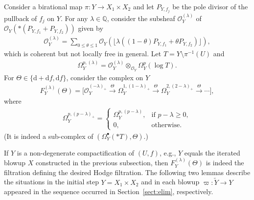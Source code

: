 \documentclass[11pt]{article}
\newcommand{\QQ}{\mathbb{Q}}
\newcommand{\sO}{\mathscr{O}}
\newcommand{\de}{\mathrm{d}}
\newcommand{\ddRH}{\Theta}
\newcommand{\cpt}{compactification}
\newcommand{\flr}[1]{\lfloor #1 \rfloor}
\begin{document}
Consider a birational map $\pi\colon Y \to X_1\times X_2$ and let $P_{Y,f_j}$ be the pole divisor of the pullback of $f_j$ on $Y$. For any $\lambda\in\QQ$, consider the subsheaf $\sO_Y^{(\lambda)}$ of $\sO_Y(*(P_{Y,f_1}+P_{Y,f_2}))$ given by
\begin{gather*} \sO_Y^{(\lambda)} = \sum_{0\leq\theta\leq1} \sO_Y\left(\flr{\lambda((1-\theta) P_{Y,f_1} + \theta P_{Y,f_2})}\right), \end{gather*}
which is coherent but not locally free in general. Let $T = Y\setminus \pi^{-1}(U)$ and
\begin{gather*} \Omega_Y^{p,(\lambda)} = \sO_Y^{(\lambda)} \otimes_{\sO_Y} \Omega_Y^p(\log T). \end{gather*}
For $\ddRH \in \{\de +\de f, \de f\}$, consider the complex on $Y$
\begin{gather*} F_Y^{(\lambda)}(\Theta) = \big[ \sO_Y^{(-\lambda)_+} \xrightarrow{\ddRH} \Omega_Y^{1,(1-\lambda)_+}	\xrightarrow{\ddRH} \Omega_Y^{2,(2-\lambda)_+}	\xrightarrow{\ddRH} \cdots \big], \end{gather*}
where
\begin{gather*} \Omega_Y^{p,(p-\lambda)_+} = \begin{cases}
\Omega_Y^{p,(p-\lambda)}, & \text{if $p-\lambda \geq 0$}, \\
0 ,& \text{otherwise}. \end{cases} \end{gather*}
(It is indeed a sub-complex of $(\Omega_Y^\bullet(*T),\ddRH)$.)

If $Y$ is a non-degenerate {\cpt} of $(U,f)$, e.g., $Y$ equals the iterated blowup $X$ constructed in the previous subsection, then $F_Y^{(\lambda)}(\ddRH)$ is indeed the filtration defining the desired Hodge filtration.
The following two lemmas describe the situations in the initial step $Y = X_1\times X_2$ and in each blowup $\varpi\colon \widetilde{Y}\to Y$ appeared in the sequence occurred in Section~\ref{sect:elim}, respectively.
\end{document}
